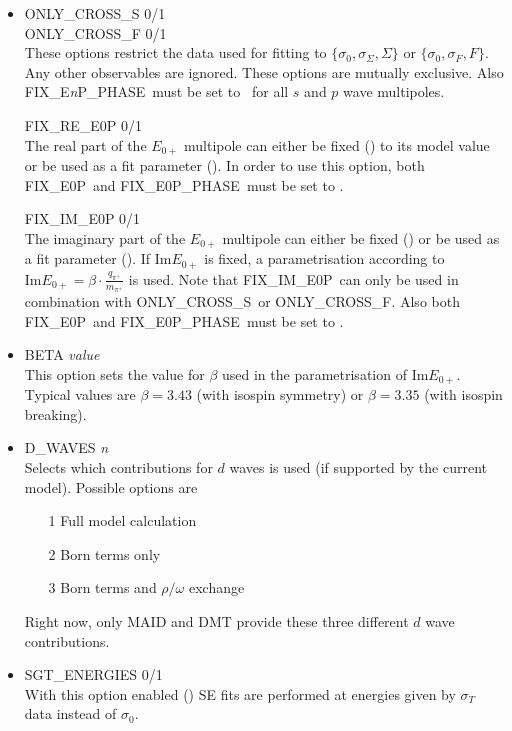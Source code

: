 \documentclass[a4paper,10pt]{article}
\def\Im{\mathrm{Im}}
\def\tt{\ttfamily}
\def\rm{\rmfamily}
\begin{document}
\begin{itemize}
\item
\tt ONLY\_CROSS\_S 0/1\rm\\
\tt ONLY\_CROSS\_F 0/1\rm\\
These options restrict the data used for fitting to $\lbrace\sigma_0,\sigma_\Sigma, \Sigma\rbrace$ or
$\lbrace\sigma_0,\sigma_F, F\rbrace$. Any other observables are ignored.
These options are mutually exclusive. Also \tt FIX\_E\textit{n}P\_PHASE\rm\ must be set to \tt0\rm\
for all $s$ and $p$ wave multipoles.

\tt FIX\_RE\_E0P 0/1\rm\\
The real part of the $E_{0+}$ multipole can either be fixed (\tt1\rm) to its model value or be used as a fit parameter (\tt0\rm).
In order to use this option, both \tt FIX\_E0P\rm\ and \tt FIX\_E0P\_PHASE\rm\ must be set to \tt0\rm.

\tt FIX\_IM\_E0P 0/1\rm\\
The imaginary part of the $E_{0+}$ multipole can either be fixed (\tt1\rm) or be used as a fit parameter (\tt0\rm). If $\Im E_{0+}$
is fixed, a parametrisation according to $\Im E_{0+} = \beta \cdot \frac{q_{\pi^+}}{m_{\pi^+}}$ is used.
Note that \tt FIX\_IM\_E0P\rm\ can only be used in combination with \tt ONLY\_CROSS\_S\rm\
or \tt ONLY\_CROSS\_F\rm. Also 
both \tt FIX\_E0P\rm\ and \tt FIX\_E0P\_PHASE\rm\ must be set to \tt0\rm.

\item
\tt BETA \textit{value}\rm\\
This option sets the value for $\beta$ used in the parametrisation of $\Im E_{0+}$. Typical values are
$\beta = 3.43$ (with isospin symmetry) or $\beta = 3.35$ (with isospin breaking).

\item
\tt D\_WAVES \textit{n}\rm\\
Selects which contributions for $d$ waves is used (if supported by the current model). Possible options are
\vspace{-0.5em}\begin{enumerate}
\item[1\:\:] Full model calculation
\item[2\:\:] Born terms only
\item[3\:\:] Born terms and $\rho/\omega$ exchange
\end{enumerate}
\vspace{-0.5em}Right now, only MAID and DMT provide these three different $d$ wave contributions.

\item
\tt SGT\_ENERGIES 0/1\rm\\
With this option enabled (\tt1\rm) SE fits are performed at energies given by $\sigma_T$ data instead of $\sigma_0$.
\end{itemize}
\end{document}

